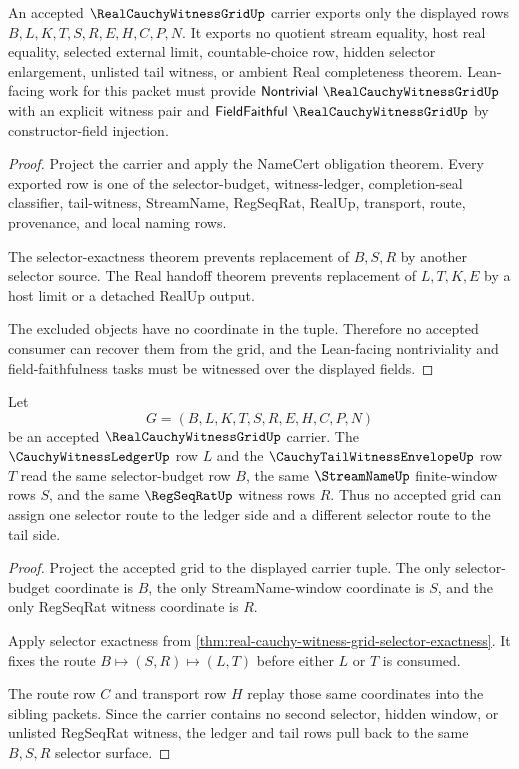 \begin{theorem}
\label{thm:real-cauchy-witness-grid-nonescape}
An accepted $\RealCauchyWitnessGridUp$ carrier exports only the displayed rows $B,L,K,T,S,R,E,H,C,P,N$. It exports no quotient stream equality, host real equality, selected external limit, countable-choice row, hidden selector enlargement, unlisted tail witness, or ambient Real completeness theorem. Lean-facing work for this packet must provide $\mathsf{Nontrivial}\ \RealCauchyWitnessGridUp$ with an explicit witness pair and $\mathsf{FieldFaithful}\ \RealCauchyWitnessGridUp$ by constructor-field injection.
\end{theorem}
\begin{proof}
Project the carrier and apply the NameCert obligation theorem. Every exported row is one of the selector-budget, witness-ledger, completion-seal classifier, tail-witness, StreamName, RegSeqRat, RealUp, transport, route, provenance, and local naming rows.

The selector-exactness theorem prevents replacement of $B,S,R$ by another selector source. The Real handoff theorem prevents replacement of $L,T,K,E$ by a host limit or a detached RealUp output.

The excluded objects have no coordinate in the tuple. Therefore no accepted consumer can recover them from the grid, and the Lean-facing nontriviality and field-faithfulness tasks must be witnessed over the displayed fields.
\end{proof}

\begin{theorem}
\label{thm:real-cauchy-witness-grid-ledger-tail-pullback}
Let
$$
G=(B,L,K,T,S,R,E,H,C,P,N)
$$
be an accepted $\RealCauchyWitnessGridUp$ carrier. The $\CauchyWitnessLedgerUp$ row $L$ and the $\CauchyTailWitnessEnvelopeUp$ row $T$ read the same selector-budget row $B$, the same $\StreamNameUp$ finite-window rows $S$, and the same $\RegSeqRatUp$ witness rows $R$. Thus no accepted grid can assign one selector route to the ledger side and a different selector route to the tail side.
\end{theorem}
\begin{proof}
Project the accepted grid to the displayed carrier tuple. The only selector-budget coordinate is $B$, the only StreamName-window coordinate is $S$, and the only RegSeqRat witness coordinate is $R$.

Apply selector exactness from \autoref{thm:real-cauchy-witness-grid-selector-exactness}. It fixes the route $B \longmapsto (S,R) \longmapsto (L,T)$ before either $L$ or $T$ is consumed.

The route row $C$ and transport row $H$ replay those same coordinates into the sibling packets. Since the carrier contains no second selector, hidden window, or unlisted RegSeqRat witness, the ledger and tail rows pull back to the same $B,S,R$ selector surface.
\end{proof}

